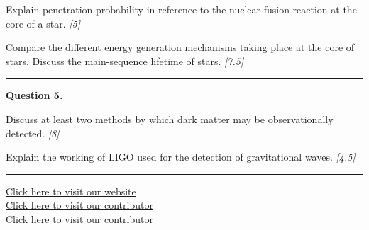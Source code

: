 \documentclass[11pt,a4paper]{article}
\newcommand{\pts}[1]{\hfill   \textit{[#1]}}
\begin{document}
\begin{parts}
  \item Explain penetration probability in reference to the nuclear fusion reaction at the core of a star. \pts{5}
  \item Compare the different energy generation mechanisms taking place at the core of stars. Discuss the main-sequence lifetime of stars. \pts{7.5}
\end{parts}

\medskip\rule{\linewidth}{0.2pt}




\noindent   \textbf{Question 5.}

\begin{parts}
  \item Discuss at least two methods by which dark matter may be observationally detected. \pts{8}
  \item Explain the working of LIGO used for the detection of gravitational waves. \pts{4.5}
\end{parts}

\vfill
\rule{\linewidth}{0.4pt}

\begin{center}\small
  \href{https://bhu-exam.vercel.app/}{Click here to visit our website}\\[4pt]
  \href{https://me-aryan.vercel.app/}{Click here to visit our contributor}\\[4pt]
  \href{https://quashan-me.vercel.app/}{Click here to visit our contributor}
\end{center}
\end{document}
